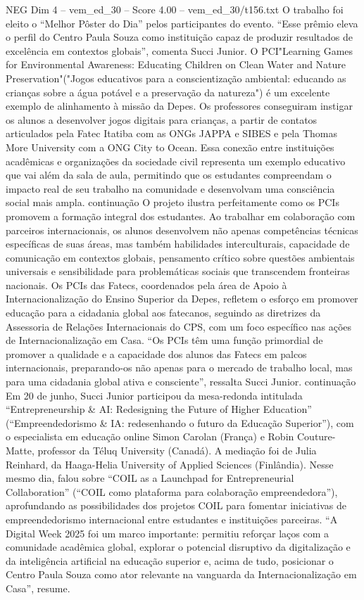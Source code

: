 \begin{textsample}{NEG Dim 4 – vem\_ed\_30 – Score 4.00 – vem\_ed\_30/t156.txt}
O trabalho foi eleito o “Melhor Pôster do Dia” pelos participantes do evento. “Esse prêmio eleva o perfil do Centro Paula Souza como instituição capaz de produzir resultados de excelência em contextos globais”, comenta Succi Junior.
O PCI"Learning Games for Environmental Awareness: Educating Children on Clean Water and Nature Preservation"("Jogos educativos para a conscientização ambiental: educando as crianças sobre a água potável e a preservação da natureza") é um excelente exemplo de alinhamento à missão da Depes.
Os professores conseguiram instigar os alunos a desenvolver jogos digitais para crianças, a partir de contatos articulados pela Fatec Itatiba com as ONGs JAPPA e SIBES e pela Thomas More University com a ONG City to Ocean.
Essa conexão entre instituições acadêmicas e organizações da sociedade civil representa um exemplo educativo que vai além da sala de aula, permitindo que os estudantes compreendam o impacto real de seu trabalho na comunidade e desenvolvam uma consciência social mais ampla. continuação O projeto ilustra perfeitamente como os PCIs promovem a formação integral dos estudantes.
Ao trabalhar em colaboração com parceiros internacionais, os alunos desenvolvem não apenas competências técnicas específicas de suas áreas, mas também habilidades interculturais, capacidade de comunicação em contextos globais, pensamento crítico sobre questões ambientais universais e sensibilidade para problemáticas sociais que transcendem fronteiras nacionais.
Os PCIs das Fatecs, coordenados pela área de Apoio à Internacionalização do Ensino Superior da Depes, refletem o esforço em promover educação para a cidadania global aos fatecanos, seguindo as diretrizes da Assessoria de Relações Internacionais do CPS, com um foco específico nas ações de Internacionalização em Casa. “Os PCIs têm uma função primordial de promover a qualidade e a capacidade dos alunos das Fatecs em palcos internacionais, preparando-os não apenas para o mercado de trabalho local, mas para uma cidadania global ativa e consciente”, ressalta Succi Junior. continuação Em 20 de junho, Succi Junior participou da mesa-redonda intitulada “Entrepreneurship \& AI: Redesigning the Future of Higher Education” (“Empreendedorismo \& IA: redesenhando o futuro da Educação Superior”), com o especialista em educação online Simon Carolan (França) e Robin Couture-Matte, professor da Téluq University (Canadá).
A mediação foi de Julia Reinhard, da Haaga-Helia University of Applied Sciences (Finlândia).
Nesse mesmo dia, falou sobre “COIL as a Launchpad for Entrepreneurial Collaboration” (“COIL como plataforma para colaboração empreendedora”), aprofundando as possibilidades dos projetos COIL para fomentar iniciativas de empreendedorismo internacional entre estudantes e instituições parceiras. “A Digital Week 2025 foi um marco importante: permitiu reforçar laços com a comunidade acadêmica global, explorar o potencial disruptivo da digitalização e da inteligência artificial na educação superior e, acima de tudo, posicionar o Centro Paula Souza como ator relevante na vanguarda da Internacionalização em Casa”, resume.

\end{textsample}
